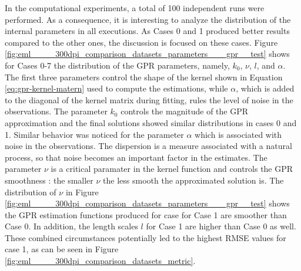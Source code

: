 \documentclass[a4paper,12pt, english]{article}
\begin{document}
In the computational experiments, a total of 100 independent runs were performed. As a consequence, it is interesting to analyze the distribution of the internal parameters in all executions.
As Cases 0 and 1 produced better results compared to the other ones, the discussion is focused on these cases.
% 
Figure \ref{fig:eml____300dpi_comparison_datasets_parameters___gpr__test} shows for Cases 0-7 the distribution of the GPR parameters, namely, $k_0$, $\nu$, $l$,  and $\alpha$. The first three parameters control the  shape of the kernel shown in Equation \ref{eq:gpr-kernel-matern}  used to compute the estimations, while $\alpha$, which is added to the diagonal of the kernel matrix during fitting,  rules the level of noise in the observations.
The parameter $ k_0 $ controls the magnitude of the GPR approximation and the final solutions showed similar distributions in cases 0 and 1.
Similar behavior was noticed for the parameter $ \alpha $ which is associated with noise in the observations. The dispersion is a measure associated with a natural process, so that noise becomes an important factor in the estimates.
The parameter $\nu$ is a critical paramater in the kernel function and controls the GPR smoothness \cite{stein-book:1999}: the smaller $\nu$ the less smooth the approximated solution is.
The distribution of $\nu$ in Figure \ref{fig:eml____300dpi_comparison_datasets_parameters___gpr__test} shows the GPR estimation functions produced for case for Case 1 are smoother than Case 0. 
In addition, the length scales $l$ for Case 1 are higher than Case 0 as well.
These combined circumstances potentially led to the highest RMSE values for case 1, as can be seen in Figure \ref{fig:eml____300dpi_comparison_datasets_metric}.
% 
\end{document}

